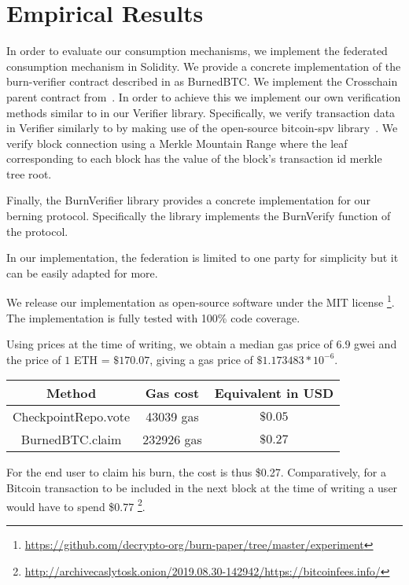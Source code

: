 \section{Empirical Results}

\newcommand{\rref}[1]{}

In order to evaluate our consumption mechanisms, we implement the federated consumption mechanism in Solidity. We provide a concrete implementation of the \textsf{burn-verifier} contract described in \rref{alg.burn-verifier} as \textsf{BurnedBTC}. We implement the \textsf{Crosschain} parent contract from~\cite{pow-sidechains}. In order to achieve this we implement our own verification methods similar to \rref{alg.verify-event-federation} in our \textsf{Verifier} library. Specifically, we verify transaction data in \textsf{Verifier} similarly to \rref{alg.verify-tx} by making use of the open-source bitcoin-spv library~\cite{bitcoin-spv-library}. We verify block connection using a Merkle Mountain Range where the leaf corresponding to each block has the value of the block's transaction id merkle tree root.

Finally, the \textsf{BurnVerifier} library provides a concrete implementation for our berning protocol. Specifically the library implements the \textsf{BurnVerify} function of the protocol.

In our implementation, the federation is limited to one party for simplicity but it can be easily adapted for more.

We release our implementation as open-source software under the MIT license
\footnote{\url{https://github.com/decrypto-org/burn-paper/tree/master/experiment}}.
The implementation is fully tested with 100\% code coverage.

Using prices at the time of writing, we obtain a median gas price of $6.9$ gwei and the price of $1$ ETH = $\$170.07$, giving a gas price of $\$1.173483 * 10^{-6}$.

\begin{center}
    \begin{tabular}{ |c|c|c| }
     \hline
     Method & Gas cost & Equivalent in USD \\
     \hline
     \textsf{CheckpointRepo.vote} & 43039 gas & $\$0.05$ \\
     \textsf{BurnedBTC.claim} & 232926 gas & $\$0.27$ \\
     \hline
    \end{tabular}
\end{center}

For the end user to claim his burn, the cost is thus \$0.27. Comparatively, for a Bitcoin transaction to be included in the next block at the time of writing a user would have to spend \$0.77
\footnote{\url{http://archivecaslytosk.onion/2019.08.30-142942/https://bitcoinfees.info/}}.
